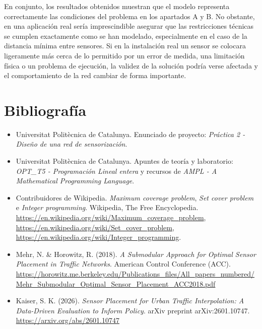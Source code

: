\documentclass[12pt,a4paper]{article}
\begin{document}
En conjunto, los resultados obtenidos muestran que el modelo representa correctamente las condiciones del problema en los apartados A y B. No obstante, en una aplicación real sería imprescindible asegurar que las restricciones técnicas se cumplen exactamente como se han modelado, especialmente en el caso de la distancia mínima entre sensores. Si en la instalación real un sensor se colocara ligeramente más cerca de lo permitido por un error de medida, una limitación física o un problema de ejecución, la validez de la solución podría verse afectada y el comportamiento de la red cambiar de forma importante.


\section*{Bibliografía}
\begin{itemize}
    \item Universitat Politècnica de Catalunya. Enunciado de proyecto: \textit{Práctica 2 - Diseño de una red de sensorización}. 
    \item Universitat Politècnica de Catalunya. Apuntes de teoría y laboratorio: \textit{OPT\_T5 - Programación Lineal entera} y recursos de \textit{AMPL - A Mathematical Programming Language}. 
    \item Contribuidores de Wikipedia. \textit{Maximum coverage problem}, \textit{Set cover problem} e \textit{Integer programming}. Wikipedia, The Free Encyclopedia. \url{https://en.wikipedia.org/wiki/Maximum_coverage_problem}, \url{https://en.wikipedia.org/wiki/Set_cover_problem}, \url{https://en.wikipedia.org/wiki/Integer_programming}.
    \item Mehr, N. \& Horowitz, R. (2018). \textit{A Submodular Approach for Optimal Sensor Placement in Traffic Networks}. American Control Conference (ACC). \url{https://horowitz.me.berkeley.edu/Publications_files/All_papers_numbered/Mehr_Submodular_Optimal_Sensor_Placement_ACC2018.pdf}
    \item Kaiser, S. K. (2026). \textit{Sensor Placement for Urban Traffic Interpolation: A Data-Driven Evaluation to Inform Policy}. arXiv preprint arXiv:2601.10747. \url{https://arxiv.org/abs/2601.10747}
\end{itemize}
\end{document}
